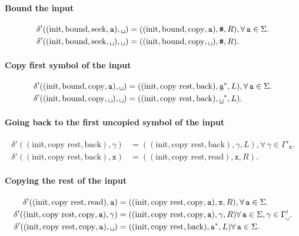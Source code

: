 \documentclass{article}
\newcommand{\obullet}[1]{\ensuremath{#1^*}}
\newcommand{\0}{\texttt{\textvisiblespace}}
\newcommand{\°}{\obullet{\0}}
\newcommand{\BB}{\obullet{\underline{\0}}}
\newcommand{\A}{\obullet{\s}}
\newcommand{\HA}{\obullet{\underline{\s}}}
\newcommand{\s}{\texttt{a}}
\newcommand{\X}{\texttt{x}}
\newcommand{\e}{\texttt{\#}}
\newcommand{\gpwb}{\Gamma'_{\0{}}}
\newcommand{\gpwx}{\Gamma'_{\X{}}}
\begin{document}
\paragraph{Bound the input}
\begin{align}
  \delta'((\text{init},\text{bound}, \text{seek}, \s), \0{})
  &= ((\text{init},\text{bound},\text{copy}, \s), \e, R),
  \forall\,\s\in\Sigma.\\
  \delta'((\text{init},\text{bound}, \text{seek}, \0{}), \0{})
  &= ((\text{init},\text{bound},\text{copy}, \0{}), \e, R).
\end{align}

\paragraph{Copy first symbol of the input}
\begin{align}
  \delta'((\text{init},\text{bound},\text{copy}, \s), \0{})
  &= ((\text{init},\text{copy rest},\text{back}), \HA, L),
  \forall\,\s \in \Sigma.\\
  \delta'((\text{init},\text{bound},\text{copy}, \0{}), \0{})
  &= ((\text{init},\text{copy rest},\text{back}), \BB, L).
\end{align}

\paragraph{Going back to the first uncopied symbol of the input}
\begin{align}
  \delta'((\text{init},\text{copy rest},\text{back}), \gamma)
  &= ((\text{init},\text{copy rest},\text{back}), \gamma, L),
  \forall\,
  \gamma \in \gpwx.\\
  \delta'((\text{init},\text{copy rest},\text{back}), \X)
  &= ((\text{init},\text{copy rest},\text{read}), \X, R).
\end{align}

\paragraph{Copying the rest of the input}
\begin{align}
  \delta'((\text{init},\text{copy rest},\text{read}), \s)
  &= ((\text{init}, \text{copy rest}, \text{copy}, \s), \X, R),
  \forall\,
  \s \in\Sigma.\\
  \delta'((\text{init}, \text{copy rest},\text{copy}, \s), \gamma)
  &= ((\text{init}, \text{copy rest},\text{copy}, \s), \gamma, R)
  \forall\,
  \s \in\Sigma,
  \gamma \in\gpwb.\\
  \delta'((\text{init}, \text{copy rest},\text{copy}, \s), \0{})
  &= ((\text{init},\text{copy rest},\text{back}), \A, L)
  \forall\,
  \s \in\Sigma.
\end{align}
\end{document}
